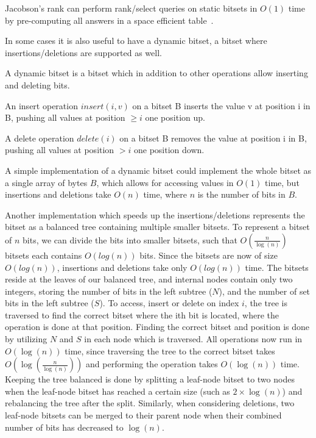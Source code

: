 Jacobson's rank can perform rank/select queries on static bitsets in $O(1)$ time by
pre-computing all answers in a space efficient table~\cite{JacobsonsRank}.

In some cases it is also useful to have a dynamic bitset, a bitset where
insertions/deletions are supported as well.

\begin{definition}

    A dynamic bitset is a bitset which in addition to other operations allow inserting and
    deleting bits.

    An insert operation $insert(i, v)$ on a bitset B inserts the value v at position i in
    B, pushing all values at position $\geq i$ one position up.

    A delete operation $delete(i)$ on a bitset B removes the value at position i in B, pushing all
    values at position $> i$ one position down.

\end{definition}

A simple implementation of a dynamic bitset could implement the whole bitset as a single
array of bytes $B$, which allows for accessing values in $O(1)$ time, but insertions and
deletions take $O(n)$ time, where $n$ is the number of bits in $B$.

Another implementation which speeds up the insertions/deletions represents the bitset as a
balanced tree containing multiple smaller bitsets. To represent a bitset of $n$ bits, we
can divide the bits into smaller bitsets, such that $O(\frac{n}{\log(n)})$ bitsets each
contains $O(log(n))$ bits. Since the bitsets are now of size $O(log(n))$, insertions and
deletions take only $O(log(n))$ time. The bitsets reside at the leaves of our balanced
tree, and internal nodes contain only two integers, storing the number of bits in the left
subtree ($N$), and the number of set bits in the left subtree ($S$). To access, insert or
delete on index $i$, the tree is traversed to find the correct bitset where the ith bit is
located, where the operation is done at that position. Finding the correct bitset and
position is done by utilizing $N$ and $S$ in each node which is traversed. All operations
now run in $O(\log(n))$ time, since traversing the tree to the correct bitset takes
$O(\log(\frac{n}{\log(n)}))$ and performing the operation takes $O(\log(n))$ time. Keeping
the tree balanced is done by splitting a leaf-node bitset to two nodes when the leaf-node
bitset has reached a certain size (such as $2 \times \log(n)$) and rebalancing the tree
after the split. Similarly, when considering deletions, two leaf-node bitsets can be
merged to their parent node when their combined number of bits has decreased to $\log(n)$.

